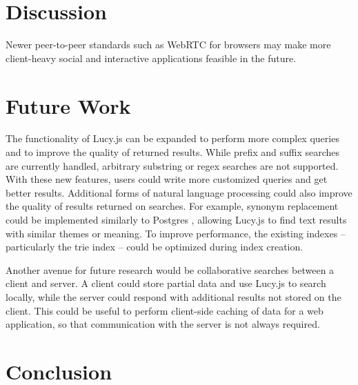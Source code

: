 \documentclass{vldb}
\begin{document}
\section{Discussion}


Newer peer-to-peer standards such as WebRTC for browsers may make more client-heavy social and interactive applications feasible in the future.

\section{Future Work}
The functionality of Lucy.js can be expanded to perform more complex queries and to improve the quality of returned results. While prefix and suffix searches are currently handled, arbitrary substring or regex searches are not supported. With these new features, users could write more customized queries and get better results. Additional forms of natural language processing could also improve the quality of results returned on searches. For example, synonym replacement could be implemented similarly to Postgres , allowing Lucy.js to find text results with similar themes or meaning. To improve performance, the existing indexes -- particularly the trie index -- could be optimized during index creation.

Another avenue for future research would be collaborative searches between a client and server. A client could store partial data and use Lucy.js to search locally, while the server could respond with additional results not stored on the client. This could be useful to perform client-side caching of data for a web application, so that communication with the server is not always required.

\section{Conclusion}



\end{document}
